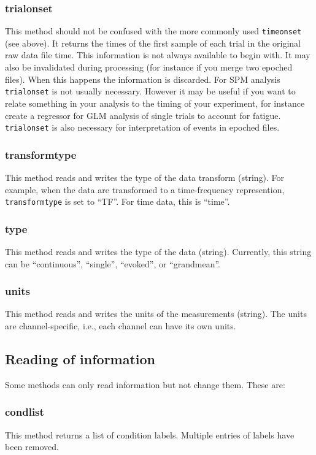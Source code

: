 \subsubsection{trialonset}
This method should not be confused with the more commonly used \texttt{timeonset} (see above). It returns the times of the first sample of each trial in the original raw data file time. This information is not always available to begin with. It may also be invalidated during processing (for instance if you merge two epoched files). When this happens the information is discarded. For SPM analysis \texttt{trialonset} is not usually necessary. However it may be useful if you want to relate something in your analysis to the timing of your experiment, for instance create a regressor for GLM analysis of single trials to account for fatigue. \texttt{trialonset} is also necessary for interpretation of events in epoched files.

\subsubsection{transformtype}
This method reads and writes the type of the data transform (string). For example, when the data are transformed to a time-frequency represention, \texttt{transformtype} is set to ``TF''. For time data, this is ``time''.

\subsubsection{type}
This method reads and writes the type of the data (string). Currently, this string can be ``continuous'', ``single'', ``evoked'', or ``grandmean''.

\subsubsection{units}
This method reads and writes the units of the measurements (string). The units are channel-specific, i.e., each channel can have its own units.


\subsection{Reading of information}
Some methods can only read information but not change them. These are:

\subsubsection{condlist}
This method returns a list of condition labels. Multiple entries of labels have been removed.

